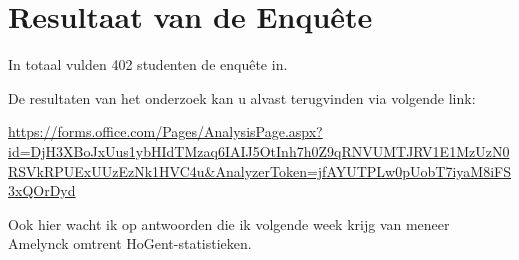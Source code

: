 
\chapter{Resultaat van de Enquête}
\label{ch:resultaten_vragen}

In totaal vulden 402 studenten de enquête in.

De resultaten van het onderzoek kan u alvast terugvinden via volgende link:

\url{https://forms.office.com/Pages/AnalysisPage.aspx?id=DjH3XBoJxUus1ybHIdTMzaq6IAIJ5OtInh7h0Z9qRNVUMTJRV1E1MzUzN0RSVkRPUExUUzEzNk1HVC4u&AnalyzerToken=jfAYUTPLw0pUobT7iyaM8iFS3xQOrDyd}

Ook hier wacht ik op antwoorden die ik volgende week krijg van meneer Amelynck omtrent HoGent-statistieken.


